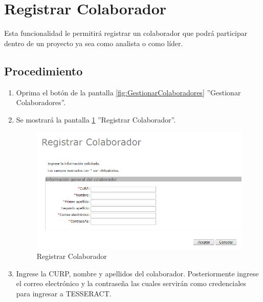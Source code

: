 \hypertarget{cv:registrarColaborador}{\section{Registrar Colaborador}} \label{sec:registrarColaborador}

	Esta funcionalidad le permitirá registrar un colaborador que podrá participar dentro de un proyecto ya sea como analista o como líder. 

		\subsection{Procedimiento}

			\begin{enumerate}
	
			\item Oprima el botón \IURegistrar{} de la pantalla \ref{fig:GestionarColaboradores} ''Gestionar Colaboradores''.
			
			\item Se mostrará la pantalla \ref{fig:registrarColaborador} ''Registrar Colaborador''.

			\begin{figure}[htbp!]
				\begin{center}
					\includegraphics[scale=0.6]{roles/administrador/colaboradores/gestionarColaboradores/pantallas/IU3-1registrarPersona}
					\caption{Registrar Colaborador}
					\label{fig:registrarColaborador}
				\end{center}
			\end{figure}
		
			\item Ingrese la CURP, nombre y apellidos del colaborador. Posteriormente ingrese el correo electrónico y la contraseña las cuales servirán como credenciales para ingresar a TESSERACT.
			

\end{enumerate}
